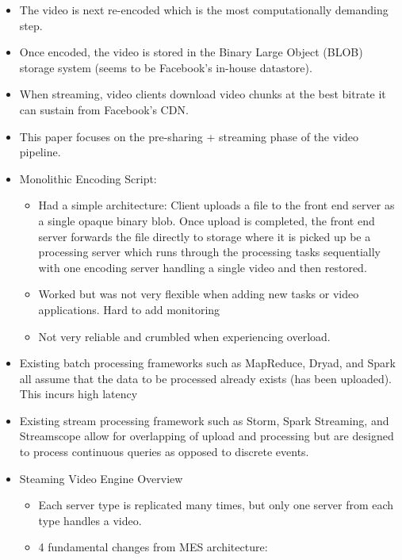 \documentclass[a4paper]{article}
\begin{document}
\begin{itemize}
\item The video is next re-encoded which is the most computationally demanding step.

\item Once encoded, the video is stored in the Binary Large Object (BLOB) storage system (seems to be Facebook's in-house datastore).

\item When streaming, video clients download video chunks at the best bitrate it can sustain from Facebook's CDN.

\item This paper focuses on the pre-sharing + streaming phase of the video pipeline.

\item Monolithic Encoding Script:
\begin{itemize}
\item Had a simple architecture: Client uploads a file to the front end server as a single opaque binary blob. Once upload is completed, the front end server forwards the file directly to storage where it is picked up be a processing server which runs through the processing tasks sequentially with one encoding server handling a single video and then restored.

\item Worked but was not very flexible when adding new tasks or video applications. Hard to add monitoring

\item Not very reliable and crumbled when experiencing overload.
\end{itemize}

\item Existing batch processing frameworks such as MapReduce, Dryad, and Spark all assume that the data to be processed already exists (has been uploaded). This incurs high latency

\item Existing stream processing framework such as Storm, Spark Streaming, and Streamscope allow for overlapping of upload and processing but are designed to process continuous queries as opposed to discrete events.

\item Steaming Video Engine Overview
\begin{itemize}
\item Each server type is replicated many times, but only one server from each type handles a video.

\item 4 fundamental changes from MES architecture:


\end{itemize}
\end{itemize}
\end{document}
